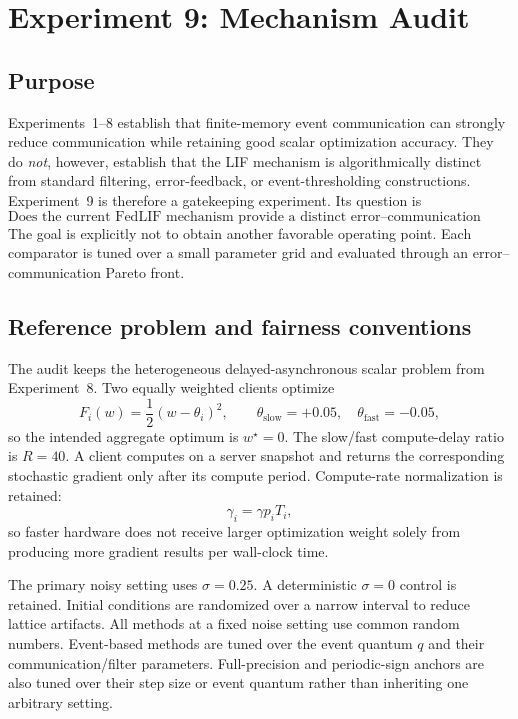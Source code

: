 \section{Experiment 9: Mechanism Audit}
\label{sec:exp9}

\subsection{Purpose}

Experiments~1--8 establish that finite-memory event communication can strongly reduce communication while retaining good scalar optimization accuracy. They do \emph{not}, however, establish that the LIF mechanism is algorithmically distinct from standard filtering, error-feedback, or event-thresholding constructions. Experiment~9 is therefore a gatekeeping experiment. Its question is
\begin{equation}
  \boxed{\text{Does the current FedLIF mechanism provide a distinct error--communication trade-off?}}
\end{equation}
The goal is explicitly not to obtain another favorable operating point. Each comparator is tuned over a small parameter grid and evaluated through an error--communication Pareto front.

\subsection{Reference problem and fairness conventions}

The audit keeps the heterogeneous delayed-asynchronous scalar problem from Experiment~8. Two equally weighted clients optimize
\begin{equation}
  F_i(w)=\frac12(w-\theta_i)^2,
  \qquad
  \theta_{\mathrm{slow}}=+0.05,
  \quad
  \theta_{\mathrm{fast}}=-0.05,
\end{equation}
so the intended aggregate optimum is $w^\star=0$. The slow/fast compute-delay ratio is $R=40$. A client computes on a server snapshot and returns the corresponding stochastic gradient only after its compute period. Compute-rate normalization is retained:
\begin{equation}
  \gamma_i=\gamma p_iT_i,
\end{equation}
so faster hardware does not receive larger optimization weight solely from producing more gradient results per wall-clock time.

The primary noisy setting uses $\sigma=0.25$. A deterministic $\sigma=0$ control is retained. Initial conditions are randomized over a narrow interval to reduce lattice artifacts. All methods at a fixed noise setting use common random numbers. Event-based methods are tuned over the event quantum $q$ and their communication/filter parameters. Full-precision and periodic-sign anchors are also tuned over their step size or event quantum rather than inheriting one arbitrary setting.

